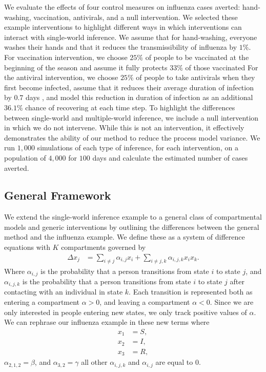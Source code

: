 \documentclass[PTRSB]{rsos}
\begin{document}
We evaluate the effects of four control measures on influenza cases averted: hand-washing, vaccination, antivirals, and a null intervention.
We selected these example interventions to highlight different ways in which interventions can interact with single-world inference.
We assume that for hand-washing, everyone washes their hands and that it reduces the transmissibility of influenza by $1\%$.
For vaccination intervention, we choose $25\%$ of people to be vaccinated at the beginning of the season and assume it fully protects $33\%$ of those vaccinated
For the antiviral intervention, we choose $25\%$ of people to take antivirals when they first become infected, assume that it reduces their average duration of infection by $0.7$ days \cite{oseltamivir:2014}, and model this reduction in duration of infection as an additional $36.1\%$ chance of recovering at each time step.
To highlight the differences between single-world and multiple-world inference, we include a null intervention in which we do not intervene.
While this is not an intervention, it effectively demonstrates the ability of our method to reduce the process model variance.
We run $1,000$ simulations of each type of inference, for each intervention, on a population of $4,000$ for $100$ days and calculate the estimated number of cases averted.

\subsection{General Framework}\label{subsection:general}

We extend the single-world inference example to a general class of compartmental models and generic interventions by outlining the differences between the general method and the influenza example.
We define these as a system of difference equations with $K$ compartments governed by 
\begin{align*}
\Delta x_{j} &= \sum_{i \neq j} \alpha_{i,j}x_i + \sum_{i \neq j, k} \alpha_{i,j,k} x_ix_k.
\end{align*}
Where $\alpha_{i,j}$ is the probability that a person transitions from state $i$ to state $j$, and $\alpha_{i,j,k}$ is the probability that a person transitions from state $i$ to state $j$ after contacting with an individual in state $k$.
Each transition is represented both as entering a compartment $\alpha > 0$, and leaving a compartment $\alpha < 0$.
Since we are only interested in people entering new states, we only track positive values of $\alpha$.
We can rephrase our influenza example in these new terms where
\begin{align*}
    x_1 &= S, \\
    x_2 &= I, \\
    x_3 &= R,
\end{align*}
$\alpha_{2,1,2} = \beta $, and $\alpha_{3,2} = \gamma$ all other $\alpha_{i,j,k}$ and $\alpha_{i,j}$ are equal to $0$.
\end{document}
